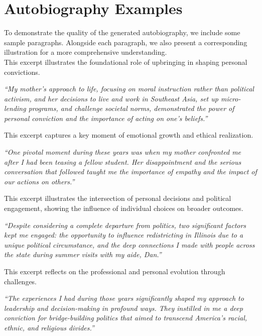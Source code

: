 \section{Autobiography Examples}\label{appendix:autobio_examples}
To demonstrate the quality of the generated autobiography, we include some sample paragraphs. Alongside each paragraph, we also present a corresponding illustration for a more comprehensive understanding. \\

\noindent This excerpt illustrates the foundational role of upbringing in shaping personal convictions.
\begin{mdframed}
\textit{``My mother's approach to life, focusing on moral instruction rather than political activism, and her decisions to live and work in Southeast Asia, set up micro-lending programs, and challenge societal norms, demonstrated the power of personal conviction and the importance of acting on one's beliefs.''}
\end{mdframed}

\noindent This excerpt captures a key moment of emotional growth and ethical realization.
\begin{mdframed}
\textit{``One pivotal moment during these years was when my mother confronted me after I had been teasing a fellow student. Her disappointment and the serious conversation that followed taught me the importance of empathy and the impact of our actions on others.''}
\end{mdframed}

\noindent This excerpt illustrates the intersection of personal decisions and political engagement, showing the influence of individual choices on broader outcomes.
\begin{mdframed}
\textit{``Despite considering a complete departure from politics, two significant factors kept me engaged: the opportunity to influence redistricting in Illinois due to a unique political circumstance, and the deep connections I made with people across the state during summer visits with my aide, Dan.''}
\end{mdframed}

\noindent This excerpt reflects on the professional and personal evolution through challenges.
\begin{mdframed}
\textit{``The experiences I had during those years significantly shaped my approach to leadership and decision-making in profound ways. They instilled in me a deep conviction for bridge-building politics that aimed to transcend America's racial, ethnic, and religious divides.''}
\end{mdframed}

